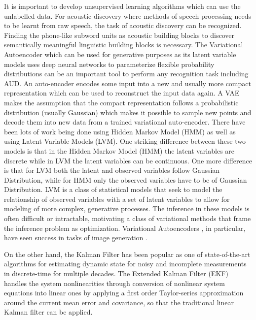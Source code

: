 \documentclass{article}
\begin{document}
 \par
It is important to develop unsupervised learning algorithms which can use the unlabelled data. For acoustic discovery where methods of speech processing needs to be learnt from raw speech, the task of acoustic discovery can be recognized. Finding the phone-like subword units as acoustic building blocks to discover semantically meaningful linguistic building blocks is necessary. The Variational Autoencoder which can be used for generative purposes as its latent variable models uses deep neural networks to parameterize flexible probability distributions can be an important tool to perform any recognition task including AUD. An auto-encoder encodes some input into a new and usually more compact representation which can be used to reconstruct the input data again. A VAE makes the assumption that the compact representation follows a probabilistic distribution (usually Gaussian) which makes it possible to sample new points and decode them into new data from a trained variational auto-encoder. There have been lots of work being done using Hidden Markov Model (HMM) \cite{Raj_2017} as well as using Latent Variable Models (LVM). One striking difference between these two models is that in the Hidden Markov Model (HMM) the latent variables are discrete while in LVM the latent variables can be continuous. One more difference is that for LVM both the latent and observed variables follow Gaussian Distribution, while for HMM only the observed variables have to be of Gaussian Distribution. LVM is a class of statistical models that seek to model the relationship of observed variables with a set of latent variables to allow for modeling of more complex, generative processes. The inference in these models is often difficult or intractable, motivating a class of variational methods that frame the inference problem as optimization. Variational Autoencoders \cite{Kingma2014}, in particular, have seen success in tasks of image generation \cite{gregor15}.

\par
On the other hand, the Kalman Filter \cite{Kalman_1960} has been popular as one of state-of-the-art algorithms for estimating dynamic state for noisy and incomplete measurements in discrete-time for multiple decades. The Extended Kalman Filter (EKF) \cite{Julier97anew} handles the system nonlinearities through conversion of nonlinear system equations into linear ones by applying a first order Taylor-series approximation around the current mean error and covariance, so that the traditional linear Kalman filter can be applied. 
\end{document}
